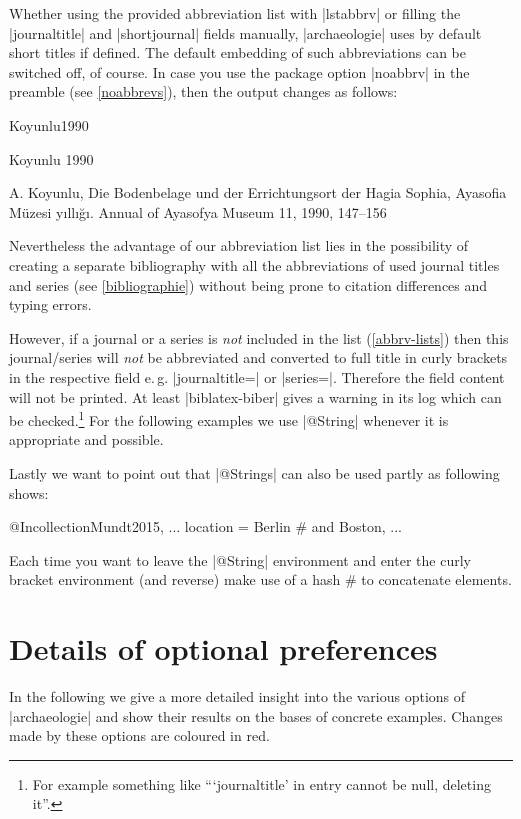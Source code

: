 \documentclass[a4paper,
10pt,
greek,
french,
spanish,
italian,
ngerman,
english
]{ltxdoc}
\begin{document}
Whether using the provided abbreviation list with |lstabbrv| or filling the |journaltitle| and |shortjournal| fields manually, 
|archaeologie| uses by default short titles if defined.
The default embedding of such abbreviations can be switched off, of course.
In case you use the package option |noabbrv| in the preamble (see \cref{noabbrevs}), then the output changes as follows:
\begin{bibbox}{Koyunlu1990}\footnotesize
\parbox[t]{2cm}{Koyunlu 1990} \parbox[t]{9cm}{A. Koyunlu, 
Die Bodenbelage und der Errichtungsort der Hagia Sophia, {\color{red}Ayasofia Müzesi yıllığı. Annual of Ayasofya Museum} 11, 1990, 147–156}
\end{bibbox}
Nevertheless the advantage of our abbreviation list lies in the possibility of creating a separate bibliography 
with all the abbreviations of used journal titles and series (see \cref{bibliographie}) without being prone to citation differences and typing errors.

However, if a journal or a series is \emph{not} included in the list (\cref{abbrv-lists}) 
then this journal/series will \emph{not} be abbreviated and converted to full title in curly brackets in the respective field e.\,g. |journaltitle=| or |series=|. 
Therefore the field content will not be printed. 
At least |biblatex-biber| gives a warning in its log which can be checked.\footnote{For example something like \enquote{\enquote{journaltitle} in entry  cannot be null, deleting it}.}
For the following examples we use |@String| whenever it is appropriate and possible.

Lastly we want to point out that |@Strings| can also be used partly as following shows:

\begin{code}
@Incollection{Mundt2015,
  ...
  location     = Berlin #{ and Boston}, %
  ...
}
\end{code}

Each time you want to leave the |@String| environment and enter the curly bracket environment (and reverse) make use of a hash \# to concatenate elements.  

\section{Details of optional preferences}\label{options-description}
In the following  we give a more detailed insight into the various options of |archaeologie| 
and show their results on the bases of concrete examples.
Changes made by these options are {\color{red}coloured in red}.
\end{document}
